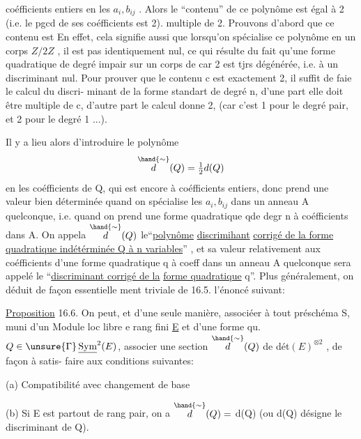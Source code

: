 
coéfficients entiers en les $a_i,b_{ij}$ . Alors le ``contenu'' de ce polynôme
est égal à 2 (i.e. le pgcd de ses coéfficients est 2).
multiple de 2.
 Prouvons d'abord que ce contenu est 
En effet, cela signifie aussi que  lorsqu'on spécialise ce polynôme
en un corps $Z/2Z$\hand{)} , il est pas identiquement nul, ce qui 
résulte du fait qu'une forme quadratique de degré impair sur un corps de
car 2 est tjrs dégénérée, i.e. à un discriminant nul. Pour prouver
que le contenu c est exactement 2, il suffit de faie le calcul du discri-%
minant de la forme standart de degré n, d'une part elle doit être multiple de c,
d'autre part le calcul donne 2, (car c'est 1 pour le degré pair, et 2 pour
le degré 1 ...).

 Il y a lieu alors d'introduire le polynôme
\[ \overset{\hand{\sim}}{d}(Q) = \tfrac{1}{2}d(Q) \]
en les coéfficients de Q, qui est encore à coéfficients entiers, donc
prend une valeur bien déterminée quand on spécialise les $a_i,b_{ij}$ dans un
anneau A quelconque, i.e. quand on prend une forme quadratique qde degr
n à coéfficients dans A. On appela $\overset{\hand{\sim}}{d}(Q)$ le``\uline{polynôme} \uline{discrimihant}
\uline{corrigé de la forme quadratique indétérminée Q à n variables}'' , et sa
valeur relativement aux coéfficients d'une forme quadratique q à coeff
dans un anneau A quelconque sera appelé le ``\uline{discriminant corrigé de la}
\uline{forme quadratique} q''. Plus généralement, on déduit de façon essentielle
ment triviale de 16.5. l'énoncé suivant:

\uline{Proposition} 16.6. On peut, et d'une seule manière, associéer à tout
préschéma S, muni d'un Module loc libre e rang fini \uline{E} et d'une forme qu.
$Q \in \unsure{\Gamma}\,\underline{\mathrm{Sym}}^2(E)$, associer une section $\overset{\hand{\sim}}{d}(Q)$ de dét$(E)^{\otimes 2}$ , de façon à satis-%
faire aux conditions suivantes:

(a) Compatibilité avec changement de base

(b) Si E est partout de rang pair, on a $\overset{\hand{\sim}}{d}(Q) =$ d(Q) (ou d(Q)
désigne le discriminant de Q).

